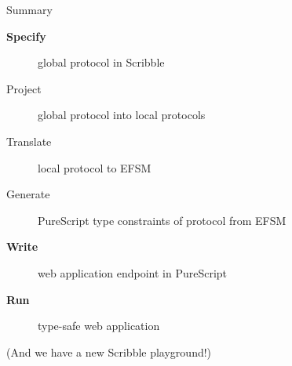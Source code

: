 \documentclass[aspectratio=1610]{beamer}
\begin{document}
\begin{frame}{Summary}
  \begin{description}
    \item [\bf Specify] \textcolor{gprot}{global protocol} in Scribble
    \item [Project] \textcolor{gprot}{global protocol} into \textcolor{lprot}{local protocols}
    \item [Translate] \textcolor{lprot}{local protocol} to \textcolor{efsm}{EFSM}
    \item [Generate] PureScript type constraints of protocol from \textcolor{efsm}{EFSM}
    \item [\bf Write] \textcolor{proc}{web application} endpoint in PureScript
    \item [\bf Run] type-safe web application
  \end{description}
  (And we have a new Scribble playground!)
\end{frame}
\end{document}
